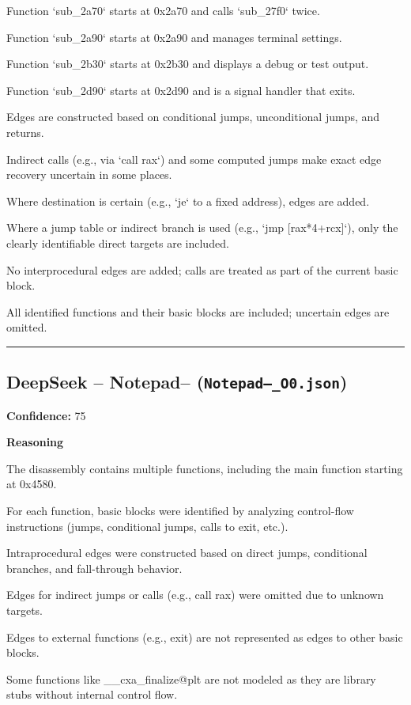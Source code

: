 Function `sub\_2a70` starts at 0x2a70 and calls `sub\_27f0` twice.

Function `sub\_2a90` starts at 0x2a90 and manages terminal settings.

Function `sub\_2b30` starts at 0x2b30 and displays a debug or test output.

Function `sub\_2d90` starts at 0x2d90 and is a signal handler that exits.

Edges are constructed based on conditional jumps, unconditional jumps, and returns.

Indirect calls (e.g., via `call rax`) and some computed jumps make exact edge recovery uncertain in some places.

Where destination is certain (e.g., `je` to a fixed address), edges are added.

Where a jump table or indirect branch is used (e.g., `jmp [rax*4+rcx]`), only the clearly identifiable direct targets are included.

No interprocedural edges are added; calls are treated as part of the current basic block.

All identified functions and their basic blocks are included; uncertain edges are omitted.

\bigskip
\hrule
\bigskip

\subsection{DeepSeek -- Notepad-- (\texttt{Notepad--\_O0.json})}

\textbf{Confidence:} 75

\textbf{Reasoning}

The disassembly contains multiple functions, including the main function starting at 0x4580.

For each function, basic blocks were identified by analyzing control-flow instructions (jumps, conditional jumps, calls to exit, etc.).

Intraprocedural edges were constructed based on direct jumps, conditional branches, and fall-through behavior.

Edges for indirect jumps or calls (e.g., call rax) were omitted due to unknown targets.

Edges to external functions (e.g., exit) are not represented as edges to other basic blocks.

Some functions like \_\_cxa\_finalize@plt are not modeled as they are library stubs without internal control flow.

